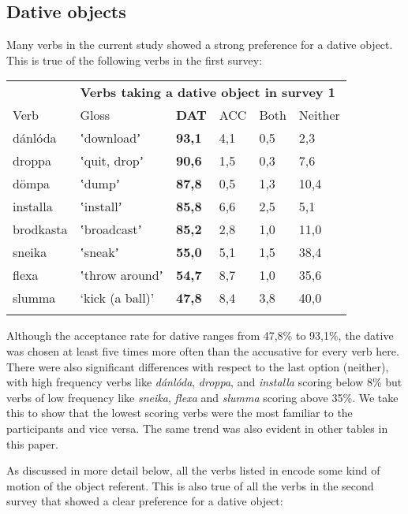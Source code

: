 \subsection{Dative objects} %

Many verbs in the current study showed a strong preference for a dative object. This is true of the following verbs in the first survey: 

\tablefirsthead{}

\tabletail{}
\tablelasttail{}
\begin{tabularx}{\textwidth}{XXXXXX}
\lsptoprule

\multicolumn{1}{X}{{\bfseries \tabref{tab:key:1}:}} & \multicolumn{5}{X}{{\bfseries Verbs taking a dative object in survey 1}}\\
Verb & Gloss & \textbf{DAT} & ACC & Both & Neither\\
dánlóda & ʽdownloadʼ & \textbf{93,1} & 4,1 & 0,5 & 2,3\\
droppa & ʽquit, dropʼ & \textbf{90,6} & 1,5 & 0,3 & 7,6\\
dömpa & ʽdumpʼ & \textbf{87,8} & 0,5 & 1,3 & 10,4\\
installa & ʽinstallʼ & \textbf{85,8} & 6,6 & 2,5 & 5,1\\
brodkasta & ʽbroadcastʼ & \textbf{85,2} & 2,8 & 1,0 & 11,0\\
sneika & ʽsneakʼ & \textbf{55,0} & 5,1 & 1,5 & 38,4\\
flexa & ʽthrow aroundʼ & \textbf{54,7} & 8,7 & 1,0 & 35,6\\
slumma & ‘kick (a ball)’ & \textbf{47,8} & 8,4 & 3,8 & 40,0\\
\lspbottomrule
\end{tabularx}
Although the acceptance rate for dative ranges from 47,8\% to 93,1\%, the dative was chosen at least five times more often than the accusative for every verb here. There were also significant differences with respect to the last option (neither), with high frequency verbs like \textit{dánlóda}, \textit{droppa}, and \textit{installa} scoring below 8\% but verbs of low frequency like \textit{sneika}, \textit{flexa} and \textit{slumma} scoring above 35\%. We take this to show that the lowest scoring verbs were the most familiar to the participants and vice versa. The same trend was also evident in other tables in this paper.

As discussed in more detail below, all the verbs listed in  encode some kind of motion of the object referent. This is also true of all the verbs in the second survey that showed a clear preference for a dative object:

